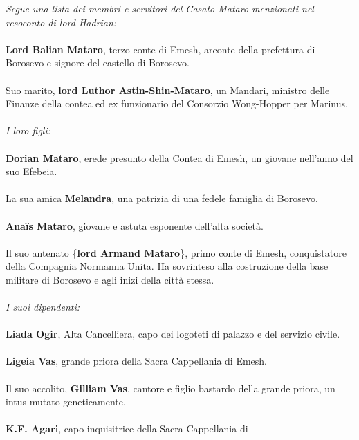 \textit{Segue una lista dei membri e servitori del Casato Mataro menzionati nel
resoconto di lord Hadrian:}
\leavevmode\\
\leavevmode\\
\phantom{123}\textbf{Lord Balian Mataro}, terzo conte di Emesh, arconte della
prefettura di Borosevo e signore del castello di Borosevo.
\leavevmode\\
\leavevmode\\
\phantom{123}Suo marito, \textbf{lord Luthor Astin-Shin-Mataro}, un Mandari, ministro
delle Finanze della contea ed ex funzionario del Consorzio Wong-Hopper
per Marinus.
\leavevmode\\
\leavevmode\\
\textit{I loro figli:}
\leavevmode\\
\leavevmode\\
\phantom{123}\textbf{Dorian Mataro}, erede presunto della Contea di Emesh, un giovane
nell'anno del suo Efebeia.
\leavevmode\\
\leavevmode\\
\phantom{123}La sua amica \textbf{Melandra}, una patrizia di una fedele famiglia di
Borosevo.
\leavevmode\\
\leavevmode\\
\phantom{123}\textbf{Anaïs Mataro}, giovane e astuta esponente dell'alta società.
\leavevmode\\
\leavevmode\\
\phantom{123}Il suo antenato \{\textbf{lord Armand Mataro}\}, primo conte di Emesh,
conquistatore della Compagnia Normanna Unita. Ha sovrinteso alla
costruzione della base militare di Borosevo e agli inizi della città
stessa.
\leavevmode\\
\leavevmode\\
\textit{I suoi dipendenti:}
\leavevmode\\
\leavevmode\\
\phantom{123}\textbf{Liada Ogir}, Alta Cancelliera, capo dei logoteti di palazzo e
del servizio civile.
\leavevmode\\
\leavevmode\\
\phantom{123}\textbf{Ligeia Vas}, grande priora della Sacra Cappellania di Emesh.
\leavevmode\\
\leavevmode\\
\phantom{123}Il suo accolito, \textbf{Gilliam Vas}, cantore e figlio bastardo della
grande priora, un intus mutato geneticamente.
\leavevmode\\
\leavevmode\\
\phantom{123}\textbf{K.F. Agari}, capo inquisitrice della Sacra Cappellania di
